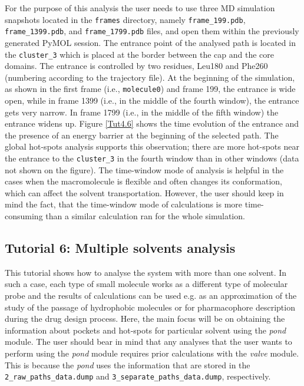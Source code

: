 \documentclass[9pt,tutorial]{livecoms}
\begin{document}
For the purpose of this analysis the user needs to use three MD simulation snapshots located in the \texttt{frames} directory, namely \texttt{frame\_199.pdb}, \texttt{frame\_1399.pdb}, and \texttt{frame\_1799.pdb} files, and open them within the previously generated PyMOL session. The entrance point of the analysed path is located in the \texttt{cluster\_3} which is placed at the border between the cap and the core domains. The entrance is controlled by two residues, Leu180 and Phe260 (numbering according to the trajectory file). At the beginning of the simulation, as shown in the first frame (i.e., \texttt{molecule0}) and frame 199, the entrance is wide open, while in frame 1399 (i.e., in the middle of the fourth window), the entrance gets very narrow. In frame 1799 (i.e., in the middle of the fifth window) the entrance widens up. Figure \ref{Tut4.6} shows the time evolution of the entrance and the presence of an energy barrier at the beginning of the selected path. The global hot-spots analysis supports this observation; there are more hot-spots near the entrance to the \texttt{cluster\_3} in the fourth window than in other windows (data not shown on the figure). The time-window mode of analysis is helpful in the cases when the macromolecule is flexible and often changes its conformation, which can affect the solvent transportation. However, the user should keep in mind the fact, that the time-window mode of calculations is more time-consuming than a similar calculation ran for the whole simulation.
\pagebreak

\subsection{Tutorial 6: Multiple solvents analysis}

This tutorial shows how to analyse the system with more than one solvent. In such a case, each type of small molecule works as a different type of molecular probe and the results of calculations can be used e.g. as an approximation of the study of the passage of hydrophobic molecules or for pharmacophore description during the drug design process. Here, the main focus will be on obtaining the information about pockets and hot-spots for particular solvent using the \emph{pond} module. The user should bear in mind that any analyses that the user wants to perform using the \emph{pond} module requires prior calculations with the \emph{valve} module. This is because the \emph{pond} uses the information that are stored in the \texttt{2\_raw\_paths\_data.dump} and \texttt{3\_separate\_paths\_data.dump}, respectively. 
\end{document}

